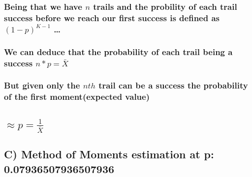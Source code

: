 \documentclass[11pt]{article}
\begin{document}
\hypertarget{being-that-we-have-n-trails-and-the-probility-of-each-trail-success-before-we-reach-our-first-success-is-defined-as-1-pk-1}{%
\subsubsection{\texorpdfstring{Being that we have \(n\) trails and the
probility of each trail success before we reach our first success is
defined as \((1-p)^{K-1}\)
\ldots{}}{Being that we have n trails and the probility of each trail success before we reach our first success is defined as (1-p)\^{}\{K-1\} \ldots{}}}\label{being-that-we-have-n-trails-and-the-probility-of-each-trail-success-before-we-reach-our-first-success-is-defined-as-1-pk-1}}

\hypertarget{we-can-deduce-that-the-probability-of-each-trail-being-a-success-n-p-barx}{%
\subsubsection{\texorpdfstring{We can deduce that the probability of
each trail being a success
\(n * p = \bar{X}\)}{We can deduce that the probability of each trail being a success n * p = \textbackslash{}bar\{X\}}}\label{we-can-deduce-that-the-probability-of-each-trail-being-a-success-n-p-barx}}

\hypertarget{but-given-only-the-nth-trail-can-be-a-success-the-probability-of-the-first-momentexpected-value}{%
\subsubsection{\texorpdfstring{But given only the \(nth\) trail can be a
success the probability of the first moment(expected
value)}{But given only the nth trail can be a success the probability of the first moment(expected value)}}\label{but-given-only-the-nth-trail-can-be-a-success-the-probability-of-the-first-momentexpected-value}}

\hypertarget{approx-p-frac1barx}{%
\subsection{\texorpdfstring{\(\approx p = \frac{1}{\bar{X}}\)}{\textbackslash{}approx p = \textbackslash{}frac\{1\}\{\textbackslash{}bar\{X\}\}}}\label{approx-p-frac1barx}}

    \hypertarget{c-method-of-moments-estimation-at-p-0.07936507936507936}{%
\subsection{C) Method of Moments estimation at p:
0.07936507936507936}\label{c-method-of-moments-estimation-at-p-0.07936507936507936}}
\end{document}
